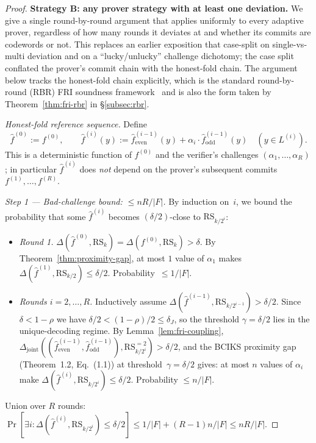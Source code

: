 \documentclass[11pt]{article}
\newcommand{\RS}{\mathrm{RS}}
\begin{document}
\begin{proof}
\textbf{Strategy B: any prover strategy with at least one deviation.}
We give a single round-by-round argument that applies uniformly to every adaptive prover, regardless of how many rounds it deviates at and whether its commits are codewords or not.  This replaces an earlier exposition that case-split on single-vs-multi deviation and on a ``lucky/unlucky'' challenge dichotomy; the case split conflated the prover's commit chain with the honest-fold chain.  The argument below tracks the honest-fold chain explicitly, which is the standard round-by-round (RBR) FRI soundness framework~\cite{BBHR,BCIKS,BGKTTW} and is also the form taken by Theorem~\ref{thm:fri-rbr} in \S\ref{subsec:rbr}.

\emph{Honest-fold reference sequence.}
Define
\[
\hat f^{(0)} := f^{(0)}, \qquad
\hat f^{(i)}(y) := \hat f^{(i-1)}_{\mathrm{even}}(y) + \alpha_i \cdot \hat f^{(i-1)}_{\mathrm{odd}}(y) \quad (y \in L^{(i)}).
\]
This is a deterministic function of $f^{(0)}$ and the verifier's challenges $(\alpha_1, \ldots, \alpha_R)$; in particular $\hat f^{(i)}$ does \emph{not} depend on the prover's subsequent commits $f^{(1)}, \ldots, f^{(R)}$.

\emph{Step 1 --- Bad-challenge bound: $\leq nR/|F|$.}
By induction on~$i$, we bound the probability that some $\hat f^{(i)}$ becomes $(\delta/2)$-close to $\RS_{k/2^i}$:
\begin{itemize}[nosep]
\item \emph{Round 1.} $\Delta(\hat f^{(0)}, \RS_k) = \Delta(f^{(0)}, \RS_k) > \delta$.  By Theorem~\ref{thm:proximity-gap}, at most $1$ value of $\alpha_1$ makes $\Delta(\hat f^{(1)}, \RS_{k/2}) \leq \delta/2$.  Probability~$\leq 1/|F|$.
\item \emph{Rounds $i = 2, \ldots, R$.}  Inductively assume $\Delta(\hat f^{(i-1)}, \RS_{k/2^{i-1}}) > \delta/2$.  Since $\delta < 1{-}\rho$ we have $\delta/2 < (1{-}\rho)/2 \leq \delta_J$, so the threshold $\gamma = \delta/2$ lies in the unique-decoding regime.  By Lemma~\ref{lem:fri-coupling}, $\Delta_{\mathrm{joint}}((\hat f^{(i-1)}_{\mathrm{even}}, \hat f^{(i-1)}_{\mathrm{odd}}), \RS_{k/2^i}^{=2}) > \delta/2$, and the BCIKS proximity gap~\cite{BCIKS} (Theorem~1.2, Eq.~(1.1)) at threshold~$\gamma = \delta/2$ gives: at most $n$ values of $\alpha_i$ make $\Delta(\hat f^{(i)}, \RS_{k/2^i}) \leq \delta/2$.  Probability $\leq n/|F|$.
\end{itemize}
Union over $R$ rounds: $\Pr[\exists i: \Delta(\hat f^{(i)}, \RS_{k/2^i}) \leq \delta/2] \leq 1/|F| + (R{-}1)n/|F| \leq nR/|F|$.


\end{proof}
\end{document}

